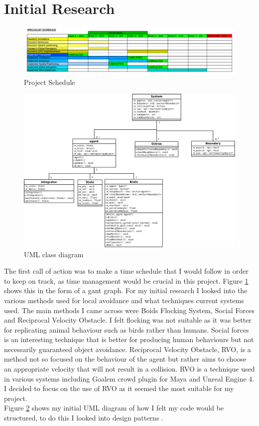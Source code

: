 \documentclass[a4paper,twocolumn]{article}
\begin{document}
\section{Initial Research}
\begin{figure}
\includegraphics[scale=0.2]{../schedule/specialistSchedule.png}
\caption{Project Schedule}
\label{fig:schedule}
\end{figure}

\begin{figure}
\includegraphics[scale=0.13]{../umlDiagram/Agent_UML_diagram.png} 
\caption{UML class diagram}
\label{fig:umldiagram}
\end{figure}
The first call of action was to make a time schedule that I would follow in order to keep on track, as time management would be crucial in this project. Figure \ref{fig:schedule} shows this in the form of a gant graph.
For my initial research I looked into the various methods used for local avoidance and what techniques current systems used. The main methods I came across were Boids Flocking System\cite{CRBF}, Social Forces and Reciprocal Velocity Obstacle. I felt flocking was not suitable as it was better for replicating animal behaviour such as birds rather than humans. Social forces is an interesting technique that is better for producing human behaviours but not necessarily guaranteed object avoidance. Reciprocal Velocity Obstacle, RVO, is a method not so focused on the behaviour of the agent but rather aims to choose an appropriate velocity that will not result in a collision. RVO is a technique used in various systems including Goalem crowd plugin for Maya and Unreal Engine 4. I decided to focus on the use of RVO as it seemed the most suitable for my project.\\
Figure \ref{fig:umldiagram} shows my initial UML diagram of how I felt my code would be structured, to do this I looked into design patterns \cite{OODPWS}\cite{GPDSWS}.\\
\end{document}
